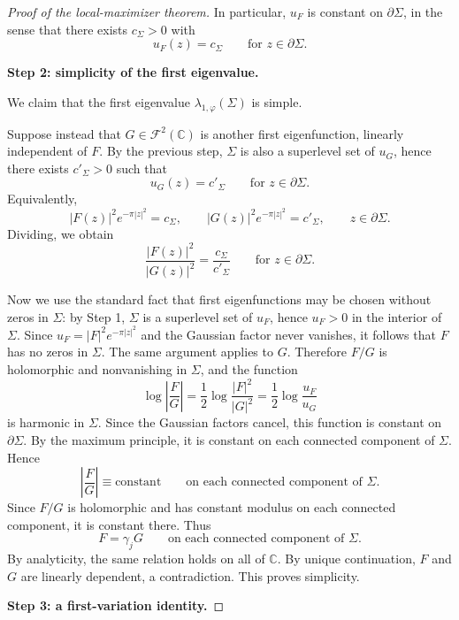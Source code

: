 \documentclass[a4paper,11pt,reqno]{amsart}
\numberwithin{equation}{section}
\theoremstyle{plain} %
\theoremstyle{definition} %
\theoremstyle{remark}
\newcommand{\C}{\mathbb{C}}
\begin{document}
\begin{proof}[Proof of the local-maximizer theorem]
In particular, \(u_F\) is constant on \(\partial \Sigma\), in the sense that
there exists \(c_\Sigma>0\) with
\begin{equation}\label{eq:boundary-level-set-new}
u_F(z)=c_\Sigma
\qquad \text{for } z\in \partial \Sigma.
\end{equation}

\medskip
\noindent
{\bf Step 2: simplicity of the first eigenvalue.}

We claim that the first eigenvalue \(\lambda_{1,\varphi}(\Sigma)\) is simple.

Suppose instead that \(G\in \mathcal F^2(\C)\) is another first eigenfunction,
linearly independent of \(F\). By the previous step, \(\Sigma\) is also a
superlevel set of \(u_G\), hence there exists \(c'_\Sigma>0\) such that
\[
u_G(z)=c'_\Sigma
\qquad\text{for } z\in \partial \Sigma.
\]
Equivalently,
\[
|F(z)|^2 e^{-\pi |z|^2}=c_\Sigma,
\qquad
|G(z)|^2 e^{-\pi |z|^2}=c'_\Sigma,
\qquad z\in \partial \Sigma.
\]
Dividing, we obtain
\[
\frac{|F(z)|^2}{|G(z)|^2}=\frac{c_\Sigma}{c'_\Sigma}
\qquad \text{for } z\in \partial \Sigma.
\]

Now we use the standard fact that first eigenfunctions may be chosen without zeros
in \(\Sigma\): by Step 1, \(\Sigma\) is a superlevel set of \(u_F\), hence \(u_F>0\) in the
interior of \(\Sigma\). Since \(u_F=|F|^2e^{-\pi |z|^2}\) and the Gaussian factor
never vanishes, it follows that \(F\) has no zeros in \(\Sigma\). The same
argument applies to \(G\). Therefore \(F/G\) is holomorphic and nonvanishing in
\(\Sigma\), and the function
\[
\log \left|\frac{F}{G}\right|
=
\frac12 \log \frac{|F|^2}{|G|^2}
=
\frac12 \log \frac{u_F}{u_G}
\]
is harmonic in \(\Sigma\). Since the Gaussian factors cancel, this function is
constant on \(\partial \Sigma\). By the maximum principle, it is constant on each
connected component of \(\Sigma\). Hence
\[
\left|\frac{F}{G}\right| \equiv \text{constant}
\qquad \text{on each connected component of } \Sigma.
\]
Since \(F/G\) is holomorphic and has constant modulus on each connected component,
it is constant there. Thus
\[
F=\gamma_j G
\qquad \text{on each connected component of } \Sigma.
\]
By analyticity, the same relation holds on all of \(\C\). By unique continuation, $F$ and $G$
are linearly dependent, a contradiction. This proves simplicity.

\medskip
\noindent
{\bf Step 3: a first-variation identity.}


\end{proof}
\end{document}
